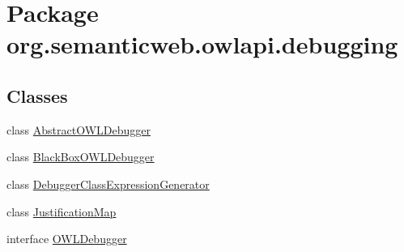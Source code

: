 \hypertarget{namespaceorg_1_1semanticweb_1_1owlapi_1_1debugging}{\section{Package org.\-semanticweb.\-owlapi.\-debugging}
\label{namespaceorg_1_1semanticweb_1_1owlapi_1_1debugging}
}
\subsection*{Classes}
\begin{DoxyCompactItemize}
\item 
class \hyperlink{classorg_1_1semanticweb_1_1owlapi_1_1debugging_1_1_abstract_o_w_l_debugger}{Abstract\-O\-W\-L\-Debugger}
\item 
class \hyperlink{classorg_1_1semanticweb_1_1owlapi_1_1debugging_1_1_black_box_o_w_l_debugger}{Black\-Box\-O\-W\-L\-Debugger}
\item 
class \hyperlink{classorg_1_1semanticweb_1_1owlapi_1_1debugging_1_1_debugger_class_expression_generator}{Debugger\-Class\-Expression\-Generator}
\item 
class \hyperlink{classorg_1_1semanticweb_1_1owlapi_1_1debugging_1_1_justification_map}{Justification\-Map}
\item 
interface \hyperlink{interfaceorg_1_1semanticweb_1_1owlapi_1_1debugging_1_1_o_w_l_debugger}{O\-W\-L\-Debugger}
\end{DoxyCompactItemize}
